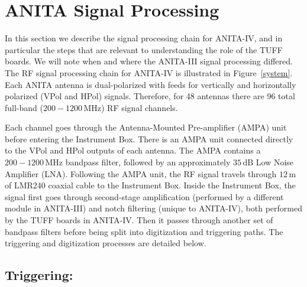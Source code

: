 \documentclass[preprint,12pt]{elsarticle}
\begin{document}
\section{ANITA Signal Processing} 
\label{processing}

In this section we describe the signal processing chain for ANITA-IV, and in particular
the steps that are relevant to understanding the role of the TUFF boards.
We will note when and where the ANITA-III signal processing differed.
The RF signal processing chain for ANITA-IV is illustrated in Figure~\ref{system}. 
Each ANITA antenna is dual-polarized with feeds for vertically and horizontally polarized (VPol and HPol) signals.
Therefore, for 48 antennas there are 96 total full-band ($200 - 1200\,\mbox{MHz}$) RF signal channels.

Each channel goes through the 
Antenna-Mounted Pre-amplifier (AMPA) unit before entering the Instrument Box. 
There is an AMPA unit connected directly to the VPol and HPol outputs of each antenna.
The AMPA contains a $200 - 1200\,\mbox{MHz}$ bandpass filter, followed by an approximately $35\,\mathrm{dB}$ Low Noise Amplifier (LNA). 
Following the AMPA unit, the RF signal travels through $12\,\mbox{m}$ of
LMR240 coaxial cable to the Instrument Box. 
Inside the Instrument Box, the signal first goes through second-stage amplification (performed by a different module in ANITA-III) 
and notch filtering (unique to ANITA-IV), both performed by the TUFF boards in ANITA-IV.
Then it passes through another set of bandpass filters before
being split into digitization and triggering paths. 
The triggering and digitization processes are detailed below.

\subsection{Triggering:}
\label{trigger}
\end{document}
